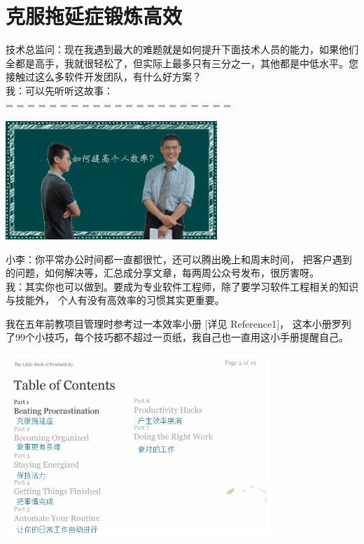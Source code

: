 \chapter{克服拖延症锻炼高效} %


技术总监问：现在我遇到最大的难题就是如何提升下面技术人员的能力，如果他们全都是高手，我就很轻松了，但实际上最多只有三分之一，其他都是中低水平。您接触过这么多软件开发团队，有什么好方案？\\
我：可以先听听这故事：\\


= = = = = = = = = = = = = = = = = = = = =



\includegraphics[width=8cm]{小李图.png}

小李：你平常办公时间都一直都很忙，还可以腾出晚上和周末时间，
把客户遇到的问题，如何解决等，汇总成分享文章，每两周公众号发布，很厉害呀。\\
我：其实你也可以做到。要成为专业软件工程师，除了要学习软件工程相关的知识与技能外，
个人有没有高效率的习惯其实更重要。

我在五年前教项目管理时参考过一本效率小册 {[}详见 Reference1{]}，
这本小册罗列了99个小技巧，每个技巧都不超过一页纸，我自己也一直用这小手册提醒自己。


\includegraphics[width=10cm]{超效率目录.png}

